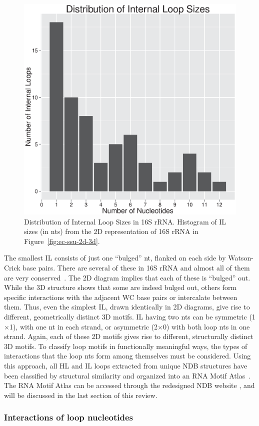 \begin{figure}
  \includegraphics[width=0.5\linewidth]{chapter-1/figs/il-sizes}
  \caption{Distribution of Internal Loop Sizes in 16S rRNA\@. Histogram of IL
  sizes (in nts) from the 2D representation of 16S rRNA in
  Figure~\ref{fig:ec-ssu-2d-3d}.}
\label{fig:ec-il-sizes}
\end{figure}

The smallest IL consists of just one ``bulged'' nt, flanked on each side by
Watson-Crick base pairs. There are several of these in 16S rRNA and almost all
of them are very conserved~\cite{Gutell1994}. The 2D diagram implies that each
of these is ``bulged'' out. While the 3D structure shows that some are indeed
bulged out, others form specific interactions with the adjacent WC base pairs or
intercalate between them. Thus, even the simplest IL, drawn identically in 2D
diagrams, give rise to different, geometrically distinct 3D motifs. IL having
two nts can be symmetric (1$\times$1), with one nt in each strand, or asymmetric
(2$\times$0) with both loop nts in one strand. Again, each of these 2D motifs
gives rise to different, structurally distinct 3D motifs. To classify loop
motifs in functionally meaningful ways, the types of interactions that the loop
nts form among themselves must be considered. Using this approach, all HL and IL
loops extracted from unique NDB structures have been classified by structural
similarity and organized into an RNA Motif Atlas~\cite{Petrov2013}. The RNA
Motif Atlas can be accessed through the redesigned NDB website
\cite{CoimbatoreNarayanan2014}, and will be discussed in the last section of
this review.

\subsubsection{Interactions of loop nucleotides}

